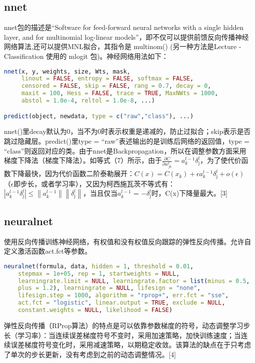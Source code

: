 \documentclass[cn]{elegantpaper}
\begin{document}
\subsection{nnet}
nnet包的描述是“Software for feed-forward neural networks with a single hidden layer, and for multinomial log-linear models”，即不仅可以提供前馈反向传播神经网络算法,还可以提供MNL拟合，其指令是 multinom() (另一种方法是Lecture - Classification 使用的 mlogit 包)。神经网络用法如下：
\bigbreak
{\setmonofont{Lucida Console} 
\begin{lstlisting}[language=R]
nnet(x, y, weights, size, Wts, mask,
     linout = FALSE, entropy = FALSE, softmax = FALSE,
     censored = FALSE, skip = FALSE, rang = 0.7, decay = 0,
     maxit = 100, Hess = FALSE, trace = TRUE, MaxNWts = 1000,
     abstol = 1.0e-4, reltol = 1.0e-8, ...)

predict(object, newdata, type = c("raw","class"), ...)     

\end{lstlisting}}
\bigbreak
nnet()里decay默认为0，当不为0时表示权重是递减的，防止过拟合；skip表示是否跳过隐藏层。predict()里type = ``raw''表述输出的是训练后网络的返回值，type = ``class''则返回对应的类。由于nnet是Backpropagation，所以在调整参数方面采用梯度下降法（梯度下降法）。如等式（7）所示，由于$\frac{\partial C}{\partial w_{j k}^{l}} =  a_{k}^{l-1} \delta_{\mathrm{j}}^{l}$，为了使代价函数下降最快，因为代价函数二阶泰勒展开：$C(x)=C\left(x_{k}\right)+\epsilon a_{k}^{l-1} \delta_{\mathrm{j}}^{l}+o(\epsilon)$（$\epsilon$即步长，或者学习率），又因为柯西施瓦茨不等式有：$\left|a_{k}^{l-1} \delta_{\mathrm{j}}^{l}\right| \leq\left\|a_{k}^{l-1}\right\|\left\| \delta_{\mathrm{j}}^{l}\right\|$，当且仅当$a_{k}^{l-1}$ = $- \delta_{\mathrm{j}}^{l}$时，C(x)下降量最大。[3]

\subsection{neuralnet}
使用反向传播训练神经网络，有权值和没有权值反向跟踪的弹性反向传播。允许自定义激活函数act.fct等参数。
\bigbreak
{\setmonofont{Lucida Console} 
\begin{lstlisting}[language=R]
neuralnet(formula, data, hidden = 1, threshold = 0.01,
	stepmax = 1e+05, rep = 1, startweights = NULL,
    learningrate.limit = NULL, learningrate.factor = list(minus = 0.5,
    plus = 1.2), learningrate = NULL, lifesign = "none",
    lifesign.step = 1000, algorithm = "rprop+", err.fct = "sse",
    act.fct = "logistic", linear.output = TRUE, exclude = NULL,
    constant.weights = NULL, likelihood = FALSE)
\end{lstlisting}}
\bigbreak
弹性反向传播（RProp算法）的特点是可以依靠参数梯度的符号，动态调整学习步长（学习率）：当连续误差梯度符号不变时，采用加速策略，加快训练速度；当连续误差梯度符号变化时，采用减速策略，以期稳定收敛。该算法的缺点在于只考虑了单次的步长更新，没有考虑到之前的动态调整情况。[4]
\end{document}
